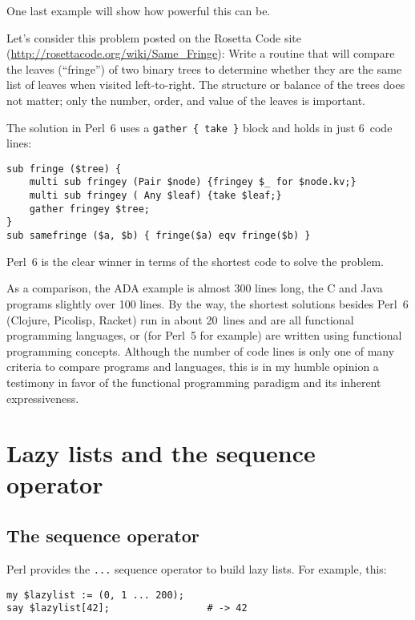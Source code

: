 One last example will show how powerful this can be.

Let's consider this problem posted on the Rosetta Code 
site (\url{http://rosettacode.org/wiki/Same_Fringe}): 
Write a routine that will compare the leaves (``fringe'') 
of two binary trees to determine whether they are the 
same list of leaves when visited left-to-right. The 
structure or balance of the trees does not matter; 
only the number, order, and value of the leaves is 
important. 

The solution in Perl~6 uses a \verb'gather { take }' 
block and holds in just 6~code lines:

\begin{verbatim}
sub fringe ($tree) {
    multi sub fringey (Pair $node) {fringey $_ for $node.kv;}
    multi sub fringey ( Any $leaf) {take $leaf;}
    gather fringey $tree;
}
sub samefringe ($a, $b) { fringe($a) eqv fringe($b) }
\end{verbatim}

Perl~6 is the clear winner in terms of the shortest code to 
solve the problem.

As a comparison, the ADA example is almost 300 lines long, 
the C and Java programs slightly over 100 lines. By the way, 
the shortest solutions besides Perl~6 (Clojure, Picolisp, 
Racket) run in about 20~lines and are all functional 
programming languages, or (for Perl~5 for example) are 
written using functional programming concepts. 
Although the number of code lines is only one of many 
criteria to compare programs and languages, this is 
in my humble opinion a testimony in favor of the functional 
programming paradigm and its inherent expressiveness.


\section{Lazy lists and the sequence operator}

\subsection{The sequence operator}

Perl provides the \verb'...' sequence operator to build 
lazy lists. For example, this:

\begin{verbatim}
my $lazylist := (0, 1 ... 200);
say $lazylist[42];                 # -> 42
\end{verbatim}

